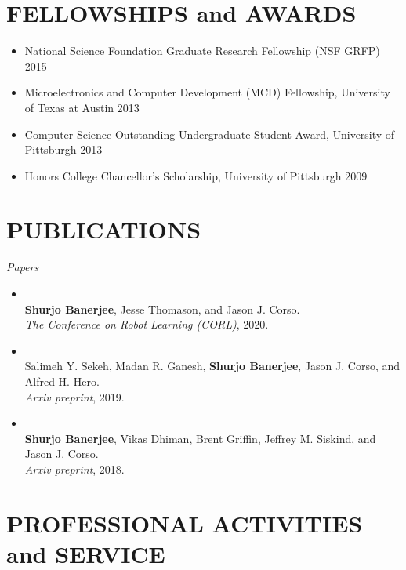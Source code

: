 \documentclass{res}
\newcommand{\citehref}[2]{\href{#1}{\color{darkblue}{#2}}}
\begin{document}
\begin{resume}
 \section{FELLOWSHIPS and AWARDS}

 \begin{itemize}
  \item National Science Foundation Graduate Research Fellowship (NSF GRFP) \hfill 2015
  \item Microelectronics and Computer Development (MCD) Fellowship, University of Texas at Austin \hfill 2013
  \item Computer Science Outstanding Undergraduate Student Award, University of Pittsburgh \hfill 2013
  \item Honors College Chancellor's Scholarship, University of Pittsburgh \hfill 2009
\end{itemize}

\section{PUBLICATIONS}

{\sl Papers}
\begin{itemize}\item \citehref{https://arxiv.org/abs/2010.12639}{The RobotSlang Benchmark: Dialog-guided Robot Localization and Navigation}\\{\bf Shurjo Banerjee}, Jesse Thomason, and Jason J. Corso.\\\textit{The Conference on Robot Learning (CORL)}, 2020.
\item \citehref{https://arxiv.org/abs/1910.01182}{A Geometric Approach to Online Streaming Feature Selection}\\Salimeh Y. Sekeh, Madan R. Ganesh, {\bf Shurjo Banerjee}, Jason J. Corso, and Alfred H. Hero.\\\textit{Arxiv preprint}, 2019.
\item \citehref{https://arxiv.org/abs/1802.02274}{A Critical Investigation of Deep Reinforcement Learning for Navigation}\\{\bf Shurjo Banerjee}, Vikas Dhiman, Brent Griffin, Jeffrey M. Siskind, and Jason J. Corso.\\\textit{Arxiv preprint}, 2018.
\end{itemize}

\section{PROFESSIONAL ACTIVITIES and SERVICE}


\end{resume}
\end{document}
